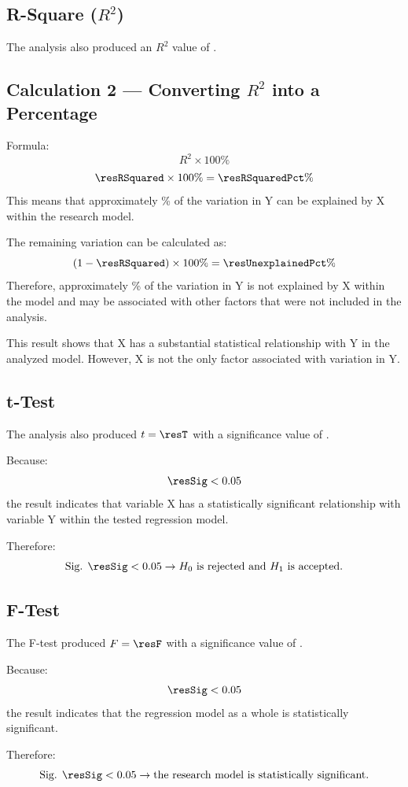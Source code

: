 \subsection{R-Square ($R^2$)}

The analysis also produced an $R^2$ value of \resRSquared{}.

\subsection{Calculation 2 --- Converting $R^2$ into a Percentage}

Formula:
\[
R^2 \times 100\%
\]
\[
\resRSquared \times 100\% = \resRSquaredPct\%
\]
This means that approximately \resRSquaredPct\% of the variation in Y can
be explained by X within the research model.

The remaining variation can be calculated as:
\[
(1 - \resRSquared) \times 100\% = \resUnexplainedPct\%
\]
Therefore, approximately \resUnexplainedPct\% of the variation in Y is not
explained by X within the model and may be associated with other factors
that were not included in the analysis.

This result shows that X has a substantial statistical relationship with
Y in the analyzed model. However, X is not the only factor associated
with variation in Y.

\subsection{t-Test}

The analysis also produced $t = \resT$ with a significance value of
\resSig{}.

Because:
\[
\resSig < 0.05
\]
the result indicates that variable X has a statistically significant
relationship with variable Y within the tested regression model.

Therefore:
\[
\text{Sig. } \resSig < 0.05 \rightarrow H_0 \text{ is rejected and } H_1 \text{ is accepted.}
\]

\subsection{F-Test}

The F-test produced $F = \resF$ with a significance value of \resSig{}.

Because:
\[
\resSig < 0.05
\]
the result indicates that the regression model as a whole is
statistically significant.

Therefore:
\[
\text{Sig. } \resSig < 0.05 \rightarrow \text{the research model is statistically significant.}
\]


